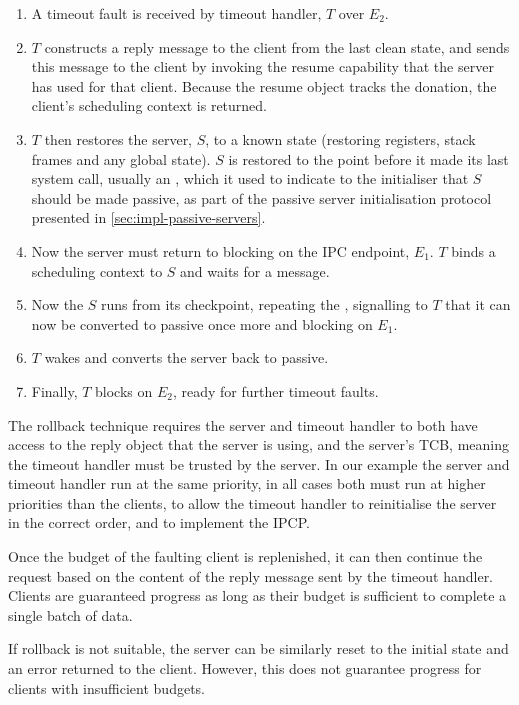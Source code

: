 \begin{enumerate}\label{e:rollback}
    \item A timeout fault is received by timeout handler, $T$ over $E_{2}$.
    \item $T$ constructs a reply message to the client from the last clean state, and sends this 
        message to the client by invoking the resume capability that the server has used for that client. 
        Because the resume object tracks the donation, the client's scheduling context is returned.
    \item $T$ then restores the server, $S$, to a known state (restoring registers,
        stack frames and any global state). $S$ is restored to the point before it made its
        last system call, usually an \nbsendrecv, which it used to indicate to the initialiser that
        $S$ should be made passive, as part of the passive server initialisation protocol presented
        in \cref{sec:impl-passive-servers}.
    \item Now the server must return to blocking on the IPC endpoint, $E_{1}$. $T$ binds a
        scheduling context to $S$ and waits for a message. 
    \item Now the $S$ runs from its checkpoint, repeating the \nbsendrecv, signalling to $T$ that it
        can now be converted to passive once more and blocking on $E_{1}$. 
    \item $T$ wakes and converts the server back to passive.
    \item Finally, $T$ blocks on $E_{2}$, ready for further timeout faults.
\end{enumerate}

The rollback technique requires the server and timeout handler to both have access to the reply
object that the server is using, and the server's \gls{TCB}, meaning the timeout handler must be
trusted by the server. In our example the server and timeout handler run at the same priority, in
all cases both must run at higher priorities than the clients, to allow the timeout handler to
reinitialise the server in the correct order, and to implement the \gls{IPCP}. 

Once the budget of the faulting client is replenished, it can then continue the request based on the
content of the reply message sent by the timeout handler. Clients are guaranteed progress as long as
their budget is sufficient to complete a single batch of data.

If rollback is not suitable, the server can be similarly reset to the initial state and an error
returned to the client. However, this does not guarantee progress for clients with insufficient
budgets.

